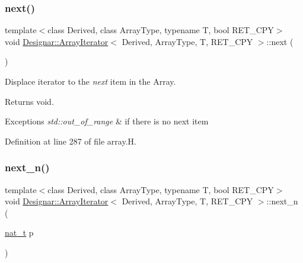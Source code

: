 \mbox{\label{class_designar_1_1_array_iterator_ac4e929d3247b68c3c9cffb43ec0891ec}} 
\subsubsection{\texorpdfstring{next()}{next()}}
{\footnotesize\ttfamily template$<$class Derived, class Array\+Type, typename T, bool R\+E\+T\+\_\+\+C\+PY$>$ \\
void \hyperlink{class_designar_1_1_array_iterator}{Designar\+::\+Array\+Iterator}$<$ Derived, Array\+Type, T, R\+E\+T\+\_\+\+C\+PY $>$\+::next (\begin{DoxyParamCaption}{ }\end{DoxyParamCaption})\hspace{0.3cm}{\ttfamily [inline]}}



Displace iterator to the {\itshape next} item in the Array. 

\begin{DoxyReturn}{Returns}
void. 
\end{DoxyReturn}

\begin{DoxyExceptions}{Exceptions}
{\em std\+::out\+\_\+of\+\_\+range} & if there is no next item \\
\hline
\end{DoxyExceptions}


Definition at line 287 of file array.\+H.

\mbox{\label{class_designar_1_1_array_iterator_a8709128b09b8b177fa1b042cb330c3e5}} 
\subsubsection{\texorpdfstring{next\+\_\+n()}{next\_n()}}
{\footnotesize\ttfamily template$<$class Derived, class Array\+Type, typename T, bool R\+E\+T\+\_\+\+C\+PY$>$ \\
void \hyperlink{class_designar_1_1_array_iterator}{Designar\+::\+Array\+Iterator}$<$ Derived, Array\+Type, T, R\+E\+T\+\_\+\+C\+PY $>$\+::next\+\_\+n (\begin{DoxyParamCaption}\item[{\hyperlink{namespace_designar_aa72662848b9f4815e7bf31a7cf3e33d1}{nat\+\_\+t}}]{p }\end{DoxyParamCaption})\hspace{0.3cm}{\ttfamily [inline]}}



